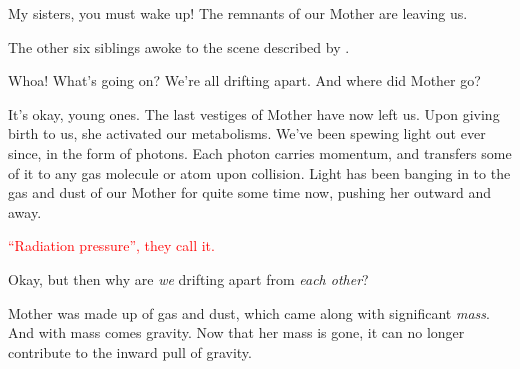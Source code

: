 \documentclass[main.tex]{subfiles}
\begin{document}
\par \Sterope My sisters, you must wake up!  The remnants of our Mother are leaving us.

\par \nar The other six siblings awoke to the scene described by \rmsterope.  

\par \Electra Whoa!  What's going on?  We're all drifting apart.  And where did Mother go?

\par \Maia It's okay, young ones.  The last vestiges of Mother have now left us.  Upon giving birth to us, she activated our metabolisms.  We've been spewing light out ever since, in the form of photons.  Each photon carries momentum, and transfers some of it to any gas molecule or atom upon collision.  Light has been banging in to the gas and dust of our Mother for quite some time now, pushing her outward and away.

\begin{tcolorbox}[sharp corners, colback=red!30, colframe=red!80!blue, title=Momentum Carried by Light]
\par \textcolor{red} {``Radiation pressure'', they call it.}
\end{tcolorbox}

\par \Electra Okay, but then why are \textit{we} drifting apart from \textit{each other}?

\par \Maia Mother was made up of gas and dust, which came along with significant \textit{mass}.  And with mass comes gravity.  Now that her mass is gone, it can no longer contribute to the inward pull of gravity.
\end{document}
